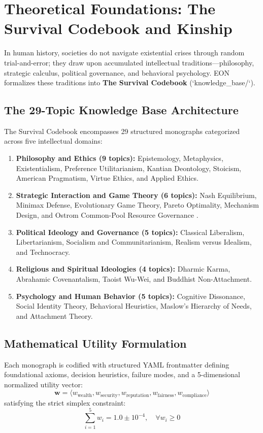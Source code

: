 \documentclass[11pt,a4paper]{article}
\begin{document}
\section{Theoretical Foundations: The Survival Codebook and Kinship}
\label{sec:theoretical_foundations}

In human history, societies do not navigate existential crises through random trial-and-error; they draw upon accumulated intellectual traditions---philosophy, strategic calculus, political governance, and behavioral psychology. EON formalizes these traditions into \textbf{The Survival Codebook} (`knowledge\_base/`).

\subsection{The 29-Topic Knowledge Base Architecture}
The Survival Codebook encompasses 29 structured monographs categorized across five intellectual domains:
\begin{enumerate}[leftmargin=*]
    \item \textbf{Philosophy and Ethics (9 topics):} Epistemology, Metaphysics, Existentialism, Preference Utilitarianism, Kantian Deontology, Stoicism, American Pragmatism, Virtue Ethics, and Applied Ethics.
    \item \textbf{Strategic Interaction and Game Theory (6 topics):} Nash Equilibrium, Minimax Defense, Evolutionary Game Theory, Pareto Optimality, Mechanism Design, and Ostrom Common-Pool Resource Governance \cite{ostrom1990governing, axelrod1984evolution}.
    \item \textbf{Political Ideology and Governance (5 topics):} Classical Liberalism, Libertarianism, Socialism and Communitarianism, Realism versus Idealism, and Technocracy.
    \item \textbf{Religious and Spiritual Ideologies (4 topics):} Dharmic Karma, Abrahamic Covenantalism, Taoist Wu-Wei, and Buddhist Non-Attachment.
    \item \textbf{Psychology and Human Behavior (5 topics):} Cognitive Dissonance, Social Identity Theory, Behavioral Heuristics, Maslow's Hierarchy of Needs, and Attachment Theory.
\end{enumerate}

\subsection{Mathematical Utility Formulation}
Each monograph is codified with structured YAML frontmatter defining foundational axioms, decision heuristics, failure modes, and a 5-dimensional normalized utility vector:
\begin{equation}
\mathbf{w} = \langle w_{\text{wealth}}, w_{\text{security}}, w_{\text{reputation}}, w_{\text{fairness}}, w_{\text{compliance}} \rangle
\end{equation}
satisfying the strict simplex constraint:
\begin{equation}
\sum_{i=1}^{5} w_i = 1.0 \pm 10^{-4}, \quad \forall w_i \ge 0
\end{equation}
\end{document}
